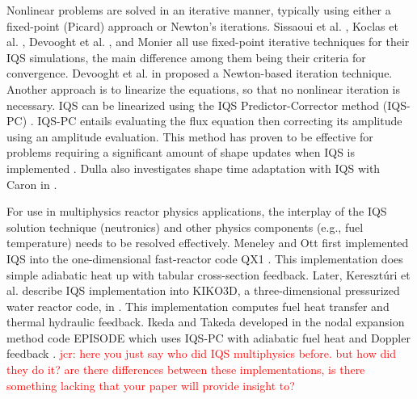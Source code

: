 \documentclass{elsarticle}
\newcommand{\iqspc}{IQS-PC\xspace}
\newcommand{\jcr}[1]{\textcolor{red}{jcr: #1}}
\begin{document}
Nonlinear problems are solved in an iterative manner, typically using either a fixed-point (Picard) approach or Newton's iterations. Sissaoui et al. \cite{Sissaoui_1995}, 
Koclas et al. \cite{Koclas_1996}, Devooght et al. \cite{Devooght_1984}, and Monier \cite{Monier_diss} all use fixed-point iterative techniques for their IQS simulations, 
the main difference among them being their criteria for convergence.  Devooght et al. in \cite{Devooght_1984} proposed a Newton-based iteration technique. Another approach 
is to linearize the equations, so that no nonlinear iteration is necessary. IQS can be linearized using the IQS Predictor-Corrector method (\iqspc) \cite{dulla2006}. 
\iqspc entails evaluating the flux equation then correcting its amplitude using an amplitude evaluation. This method has proven to be effective for problems 
requiring a significant amount of shape updates when IQS is implemented \cite{Dulla2008}. Dulla also investigates shape time adaptation with IQS with Caron in \cite{caron2017}.

For use in multiphysics reactor physics applications, the interplay of the IQS solution technique (neutronics) and other physics components (e.g., fuel temperature) needs to be 
resolved effectively. Meneley and Ott first implemented IQS into the one-dimensional fast-reactor code QX1 \cite{Meneley_1971}. This implementation does simple adiabatic heat up 
with tabular cross-section feedback. Later, Kereszt\'{u}ri et al. describe IQS implementation into KIKO3D, a three-dimensional pressurized water reactor code, in \cite{KIKO3D_2003}. 
This implementation computes fuel heat transfer and thermal hydraulic feedback. Ikeda and Takeda developed in the nodal expansion method code EPISODE which uses \iqspc with adiabatic 
fuel heat and Doppler feedback \cite{Ikeda_2001}. \jcr{here you just say who did IQS multiphysics before. but how did they do it? are there differences between these implementations,
is there something lacking that your paper will provide insight to?}
\end{document}
